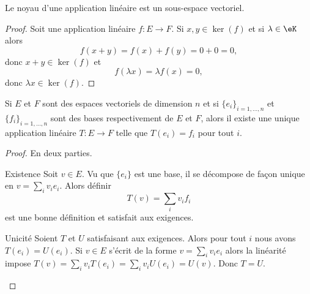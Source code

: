 \begin{proposition}     \label{PROPooRLLPooKYzsJp}
	Le noyau d'une application linéaire est un sous-espace vectoriel.
\end{proposition}

\begin{proof}
	Soit une application linéaire \( f\colon E\to F\). Si \( x,y\in \ker(f)\) et si \( \lambda\in \eK\) alors
	\begin{equation}
		f(x+y)=f(x)+f(y)=0+0=0,
	\end{equation}
	donc \( x+y\in \ker(f)\) et
	\begin{equation}
		f(\lambda x)=\lambda f(x)=0,
	\end{equation}
	donc \( \lambda x\in \ker(f)\).
\end{proof}

\begin{proposition}
	Si \( E\) et \( F\) sont des espaces vectoriels de dimension \( n\) et si \( \{ e_i \}_{i=1,\ldots, n}\) et \( \{ f_i \}_{i=1,\ldots, n}\) sont des bases respectivement de \( E\) et \( F\), alors il existe une unique application linéaire \( T\colon E\to F\) telle que \( T(e_i)=f_i\) pour tout \( i\).
\end{proposition}

\begin{proof}
	En deux parties.\begin{subproof}
		\item[Existence]
		Soit \( v\in E\). Vu que \( \{ e_i \}\) est une base, il se décompose de façon unique en \( v=\sum_iv_ie_i\). Alors définir
		\begin{equation}
			T(v)=\sum_iv_if_i
		\end{equation}
		est une bonne définition et satisfait aux exigences.
		\item[Unicité]
		Soient \( T\) et \( U\) satisfaisant aux exigences. Alors pour tout \( i\) nous avons \( T(e_i)=U(e_i)\). Si \( v\in E\) s'écrit de la forme \( v=\sum_iv_ie_i\) alors la linéarité impose \( T(v)=\sum_iv_iT(e_i)=\sum_iv_iU(e_i)=U(v)\). Donc \( T = U\).
	\end{subproof}
\end{proof}

